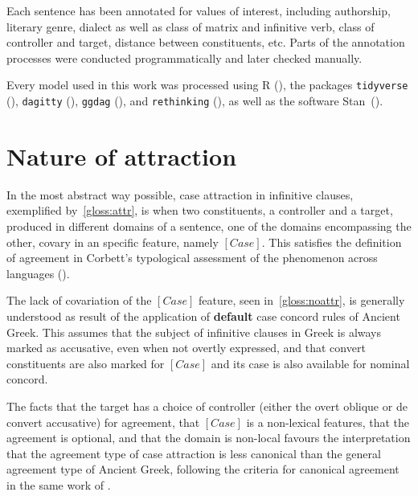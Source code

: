 \documentclass[a4paper, 12pt, article]{memoir}
\begin{document}
Each sentence has been annotated for values of interest, including authorship,
literary genre, dialect as well as class of matrix and infinitive verb, class of
controller and target, distance between constituents, etc.
Parts of the annotation processes were conducted programmatically and later
checked manually.

Every model used in this work was processed using R (\cite{R}), the packages
\texttt{tidyverse} (\cite{tidyverse}), \texttt{dagitty} (\cite{dagitty}),
\texttt{ggdag} (\cite{ggdag}), and \texttt{rethinking} (\cite{McElreath2020}),
as well as the software Stan~(\cite{StanReferenceManual,StanUserGuide}).


\chapter{Nature of attraction} %

In the most abstract way possible, case attraction in infinitive clauses,
exemplified by~\ref{gloss:attr}, is when two constituents, a controller and a
target, produced in different domains of a sentence, one of the domains
encompassing the other, covary in an specific feature, namely $[Case]$.
This satisfies the definition of agreement in Corbett's typological assessment
of the phenomenon across languages (\citeyear[pp.\ 4--7]{Corbett2006}).

The lack of covariation of the $[Case]$ feature, seen in~\ref{gloss:noattr}, is
generally understood as result of the application of \textbf{default} case
concord rules of Ancient Greek.
This assumes that the subject of infinitive clauses in Greek is always marked as
accusative, even when not overtly expressed, and that convert constituents are
also marked for $[Case]$ and its case is also available for nominal concord.

The facts that the target has a choice of controller (either the overt oblique or
de convert accusative) for agreement, that $[Case]$ is a non\hyp{}lexical
features, that the agreement is optional, and that the domain is non\hyp{}local
favours the interpretation that the agreement type of case attraction is less
canonical than the general agreement type of Ancient Greek, following the
criteria for canonical agreement in the same work of \textcite[pp.\
8ff.]{Corbett2006}.
\end{document}
